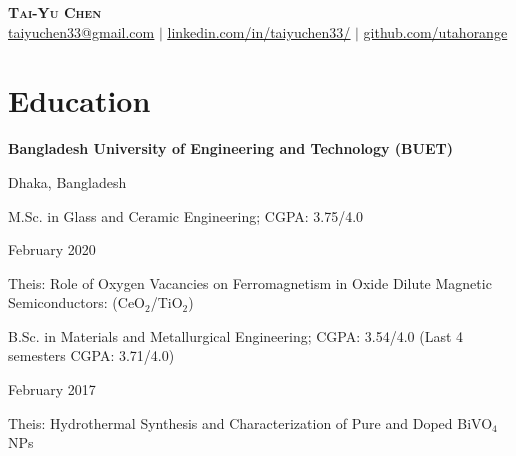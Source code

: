 \documentclass[letterpaper,20pt]{article}
\begin{document}
\begin{center}
    \textbf{\Huge \scshape Tai-Yu Chen} \\ \vspace{1pt}
    \href{mailto:taiyuchen33@gmail.com}{\underline{taiyuchen33@gmail.com}} $|$ 
    \href{https://www.linkedin.com/in/taiyuchen33/}{\underline{linkedin.com/in/taiyuchen33/}} $|$
    \href{https://github.com/utahorange}{\underline{github.com/utahorange}}
\end{center}



\section{Education}
    \begin{minipage}{.75\linewidth} \begin{flushleft}
    		\textbf{Bangladesh University of Engineering and Technology (BUET)}
    	\end{flushleft} \end{minipage}
    \hfill 
    \begin{minipage}{.20\linewidth}\begin{flushright}
    	 Dhaka, Bangladesh
    	\end{flushright}\end{minipage}
    	
    	\begin{minipage}{.75\linewidth} \begin{flushleft}
    		M.Sc. in Glass and Ceramic Engineering;  CGPA: 3.75/4.0\\
    	\end{flushleft} \end{minipage}
    \hfill 
    \begin{minipage}{.20\linewidth}\begin{flushright}
    	 February 2020
    	\end{flushright}\end{minipage} 
	 Theis: Role of Oxygen Vacancies on Ferromagnetism in Oxide Dilute Magnetic Semiconductors: (CeO$_2$/TiO$_{2}$)\\
	
   		\begin{minipage}{.85\linewidth} \begin{flushleft}
    		B.Sc. in Materials and Metallurgical Engineering;  CGPA: 3.54/4.0 (Last 4 semesters CGPA: 3.71/4.0)\\
    	\end{flushleft} \end{minipage}
    \hfill 
    \begin{minipage}{.13\linewidth}\begin{flushright}
    	 February 2017
    	\end{flushright}\end{minipage}
	 Theis: Hydrothermal Synthesis and Characterization of Pure and Doped BiVO$_{4}$ NPs\\
	 \vspace{2pt}
\end{document}
